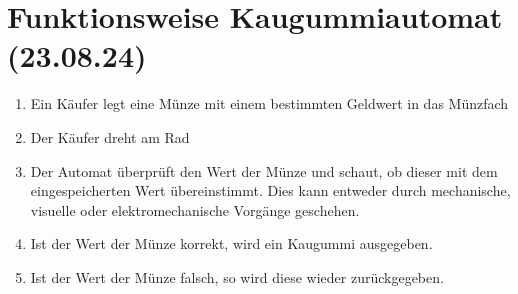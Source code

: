 \documentclass[12pt,a4paper]{report}
\begin{document}
	\section{Funktionsweise Kaugummiautomat (23.08.24)}
	\begin{enumerate}
		\item Ein Käufer legt eine Münze mit einem bestimmten Geldwert in das Münzfach
		\item Der Käufer dreht am Rad
		\item Der Automat überprüft den Wert der Münze und schaut, ob dieser mit dem eingespeicherten Wert übereinstimmt. Dies kann entweder durch mechanische,  visuelle oder elektromechanische Vorgänge geschehen.
		\item Ist der Wert der Münze korrekt, wird ein Kaugummi ausgegeben.
		\item Ist der Wert der Münze falsch, so wird diese wieder zurückgegeben.
	\end{enumerate}
\end{document}
